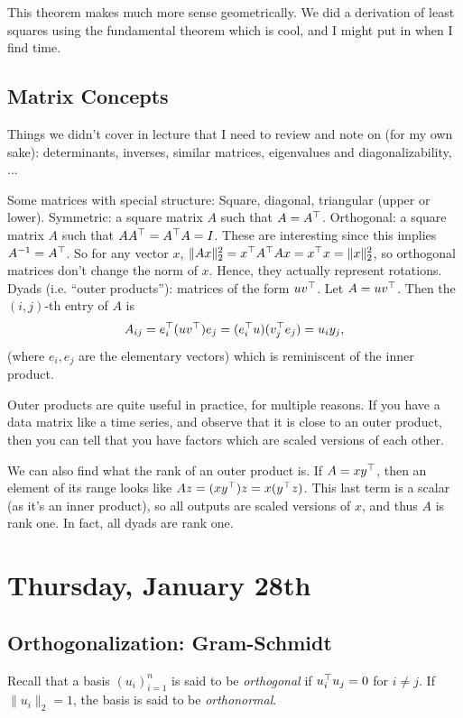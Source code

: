 \documentclass[11 pt]{scrartcl}
\begin{document}
This theorem makes much more sense geometrically. 
We did a derivation of least squares using the fundamental theorem which is cool, and I might put in when I find time. 

\subsection{Matrix Concepts}
Things we didn't cover in lecture that I need to review and note on (for my own sake): determinants, inverses, similar matrices, eigenvalues and diagonalizability, ... 

Some matrices with special structure: 
\itemnum
    \ii Square, diagonal, triangular (upper or lower). 
    \ii Symmetric: a square matrix $A$ such that $A = A^\top$. 
    \ii Orthogonal: a square matrix $A$ such that $AA^\top = A^\top A = I$. 
    These are interesting since this implies $A^{-1} = A^\top$. 
    So for any vector $x$, $\|Ax\|_2^2 = x^\top A^\top Ax = x^\top x = \|x\|_2^2$, so orthogonal matrices don't change the norm of $x$. 
    Hence, they actually represent rotations. 
    \ii Dyads (i.e. ``outer products''): matrices of the form $uv^\top$. 
    Let $A = uv^\top$. Then the $(i,j)$-th entry of $A$ is 
    \[ A_{ij} = e_i^\top(uv^\top) e_j = (e_i^\top u)(v_j^\top e_j) = u_iy_j,\] 
    (where $e_i, e_j$ are the elementary vectors) which is reminiscent of the inner product. 
\itemend

Outer products are quite useful in practice, for multiple reasons. 
If you have a data matrix like a time series, and observe that it is close to an outer product, then you can tell that you have factors which are scaled versions of each other. 

We can also find what the rank of an outer product is. 
If $A = xy^\top$, then an element of its range looks like $Az = (xy^\top)z = x(y^\top z)$. 
This last term is a scalar (as it's an inner product), so all outputs are scaled versions of $x$, and thus $A$ is rank one. 
In fact, all dyads are rank one. 

\newpage
\section{Thursday, January 28th}

\subsection{Orthogonalization: Gram-Schmidt}
Recall that a basis $(u_i)_{i=1}^n$ is said to be \emph{orthogonal} if $u_i^\top u_j = 0$ for $i\not= j$. 
If $\|u_i\|_2 = 1$, the basis is said to be \emph{orthonormal}.
\end{document}
